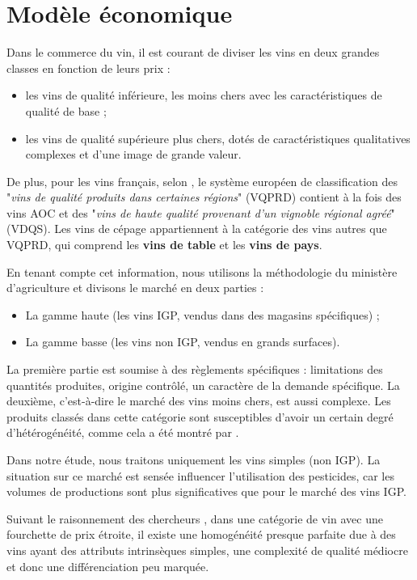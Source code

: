 \documentclass[11pt, a4paper]{article}
\begin{document}
\section{Modèle économique}
Dans le commerce du vin, il est courant de diviser les vins en deux grandes classes en fonction de leurs prix \cite{cembalo2014} : 
\begin{itemize}
    \item les vins de qualité inférieure, les moins chers avec les caractéristiques de qualité de base ;
    \item les vins de qualité supérieure plus chers, dotés de caractéristiques qualitatives complexes et d'une image de grande valeur.
\end{itemize} %
\par
De plus, pour les vins français, selon \citet{steiner2004}, le système européen de classification des "\textit{vins de qualité produits dans certaines régions}" (VQPRD) contient à la fois des vins AOC et des "\textit{vins de haute qualité provenant d'un vignoble régional agréé}" (VDQS). 
Les vins de cépage appartiennent à la catégorie des vins autres que VQPRD, qui comprend les \textbf{vins de table} et les \textbf{vins de pays}.
\par
En tenant compte cet information, nous utilisons la méthodologie du ministère d'agriculture et divisons le marché en deux parties :
\begin{itemize}
    \item La gamme haute (les vins IGP, vendus dans des magasins spécifiques) ;
    \item La gamme basse (les vins non IGP, vendus en grands surfaces).
\end{itemize}
\par
La première partie est soumise à des règlements spécifiques : limitations des quantités produites, origine contrôlé, un caractère de la demande spécifique. 
La deuxième, c'est-à-dire le marché des vins moins chers, est aussi complexe. Les produits classés dans cette catégorie sont susceptibles d'avoir un certain degré d'hétérogénéité, comme cela a été montré par \citet{cembalo2014}.
\par
Dans notre étude, nous traitons uniquement les vins simples (non IGP). 
La situation sur ce marché est sensée influencer l'utilisation des pesticides, car les volumes de productions sont plus significatives que pour le marché des vins IGP.
\par 
Suivant le raisonnement des chercheurs \cite{cembalo2014}, dans une catégorie de vin avec une fourchette de prix étroite, il existe une homogénéité presque parfaite due à des vins ayant des attributs intrinsèques simples, une complexité de qualité médiocre et donc une différenciation peu marquée.
\end{document}

